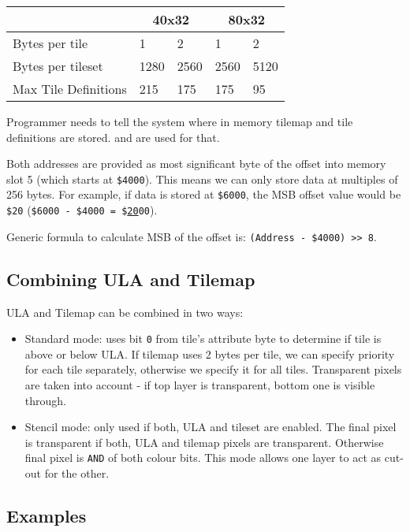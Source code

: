 \documentclass[12pt,twoside,openright,a4paper]{book}
\begin{document}
{
	\def\arraystretch{1.2}
	\begin{tabular}{|l|l|l|l|l|}
		\hline
		& \multicolumn{2}{c|}{40x32} & \multicolumn{2}{c|}{80x32} \\
		\hline
		Bytes per tile & 1 & 2 & 1 & 2 \\
		\hline
		Bytes per tileset & 1280 & 2560 & 2560 & 5120 \\
		\hline
		Max Tile Definitions & 215 & 175 & 175 & 95 \\
		\hline
	\end{tabular}
}

Programmer needs to tell the system where in memory tilemap and tile definitions are stored.  and  are used for that.

Both addresses are provided as most significant byte of the offset into memory slot 5 (which starts at {\tt \$4000}). This means we can only store data at multiples of 256 bytes. For example, if data is stored at {\tt \$6000}, the MSB offset value would be {\tt \$20} ({\tt \$6000 - \$4000 = \$\underline{20}00}).

Generic formula to calculate MSB of the offset is: {\tt (Address - \$4000) >> 8}.


\subsection{Combining ULA and Tilemap}

ULA and Tilemap can be combined in two ways:

\begin{itemize}[topsep=1pt,itemsep=1pt]
	\item Standard mode: uses bit {\tt 0} from tile's attribute byte to determine if tile is above or below ULA. If tilemap uses 2 bytes per tile, we can specify priority for each tile separately, otherwise we specify it for all tiles. Transparent pixels are taken into account - if top layer is transparent, bottom one is visible through.
	
	\item Stencil mode: only used if both, ULA and tileset are enabled. The final pixel is transparent if both, ULA and tilemap pixels are transparent. Otherwise final pixel is {\tt AND} of both colour bits. This mode allows one layer to act as cut-out for the other.
\end{itemize}


\subsection{Examples}
\end{document}
